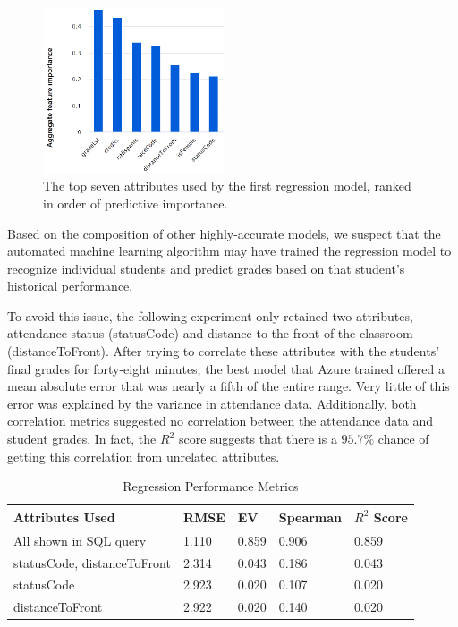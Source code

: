 \begin{figure}[ht]
  \centering
	\includegraphics[width=0.48\textwidth]{figures/regression1ImportantFeatures.png}
	\caption{The top seven attributes used by the first regression model, ranked in order of predictive importance.}
	\label{fig:regression1ImportantFeatures}
\end{figure}

Based on the composition of other highly-accurate models, we suspect that the automated machine learning algorithm may have trained the regression model to recognize individual students and predict grades based on that student's historical performance.

To avoid this issue, the following experiment only retained two attributes, attendance status (statusCode) and distance to the front of the classroom (distanceToFront). After trying to correlate these attributes with the students' final grades for forty-eight minutes, the best model that Azure trained offered a mean absolute error that was nearly a fifth of the entire range. Very little of this error was explained by the variance in attendance data. Additionally, both correlation metrics suggested no correlation between the attendance data and student grades. In fact, the $R^2$ score suggests that there is a $95.7\%$ chance of getting this correlation from unrelated attributes.

\begin{table}[ht]
  \centering
  \caption{Regression Performance Metrics}
  \begin{tabular}[t]{lllll}
    \hline
    Attributes Used & RMSE & EV & Spearman & $R^2$ Score \\
    \hline
    All shown in SQL query & 1.110 & 0.859 & 0.906 & 0.859 \\
    statusCode, distanceToFront & 2.314 & 0.043 & 0.186 & 0.043 \\
    statusCode & 2.923 & 0.020 & 0.107 & 0.020 \\
    distanceToFront & 2.922 & 0.020 & 0.140 & 0.020 \\
    \hline
  \end{tabular}
  \label{tab:regressionMetrics}
\end{table}

